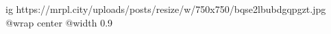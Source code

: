  
 
 
 
 

\ifcmt
  ig https://mrpl.city/uploads/posts/resize/w/750x750/bqse2lbubdgqpgzt.jpg
  @wrap center
  @width 0.9
\fi

